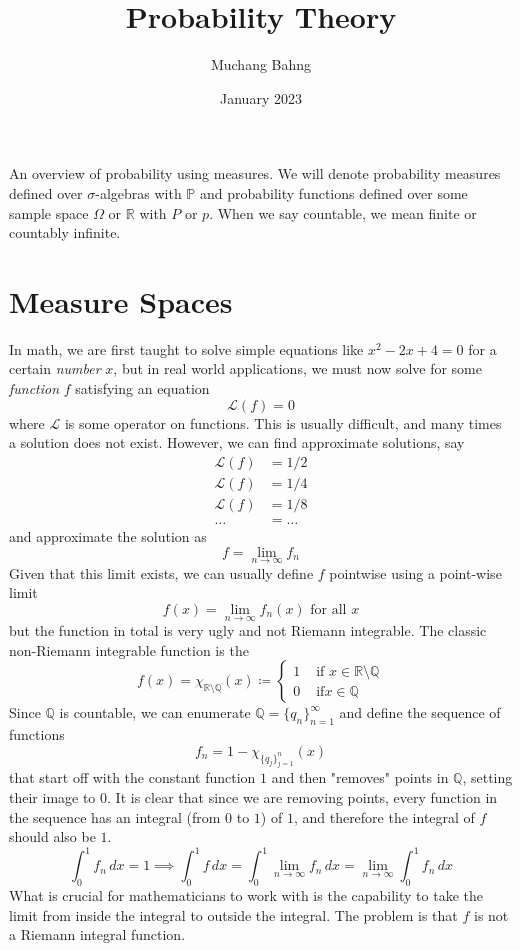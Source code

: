 \documentclass{article}
\theoremstyle{definition}
\theoremstyle{remark}
\theoremstyle{definition}
\begin{document}
\pagestyle{fancy}

\cfoot{\thepage / \pageref{LastPage}}

\title{Probability Theory}
\author{Muchang Bahng}
\date{January 2023}

\maketitle

An overview of probability using measures. We will denote probability measures defined over $\sigma$-algebras with $\mathbb{P}$ and probability functions defined over some sample space $\Omega$ or $\mathbb{R}$ with $P$ or $p$. When we say countable, we mean finite or countably infinite. 

\section{Measure Spaces}

In math, we are first taught to solve simple equations like $x^2 - 2x + 4 = 0$ for a certain \textit{number} $x$, but in real world applications, we must now solve for some \textit{function} $f$ satisfying an equation 
\[\mathcal{L}(f) = 0\]
where $\mathcal{L}$ is some operator on functions. This is usually difficult, and many times a solution does not exist. However, we can find approximate solutions, say 
\begin{align*}
    \mathcal{L}(f) & = 1/2 \\
    \mathcal{L}(f) & = 1/4 \\ 
    \mathcal{L}(f) & = 1/8 \\
    \ldots & = \ldots 
\end{align*}
and approximate the solution as 
\[f = \lim_{n \rightarrow \infty} f_n \]
Given that this limit exists, we can usually define $f$ pointwise using a point-wise limit 
\[f(x) = \lim_{n \rightarrow \infty} f_n (x) \text{ for all } x\]
but the function in total is very ugly and not Riemann integrable. The classic non-Riemann integrable function is the 
\[f(x) = \chi_{\mathbb{R} \setminus \mathbb{Q}} (x) \coloneqq \begin{cases} 
1 & \text{ if } x \in \mathbb{R} \setminus \mathbb{Q} \\
0 & \text{ if} x \in \mathbb{Q} 
\end{cases}\]
Since $\mathbb{Q}$ is countable, we can enumerate $\mathbb{Q} = \{q_n\}_{n=1}^\infty$ and define the sequence of functions 
\[f_n = 1 - \chi_{\{q_j\}_{j=1}^n}(x)\]
that start off with the constant function $1$ and then "removes" points in $\mathbb{Q}$, setting their image to $0$. It is clear that since we are removing points, every function in the sequence has an integral (from $0$ to $1$) of $1$, and therefore the integral of $f$ should also be $1$. 
\[\int_0^1 f_n \, dx = 1 \implies \int_0^1 f \,dx = \int_0^1 \lim_{n \rightarrow \infty} f_n \,dx = \lim_{n \rightarrow \infty} \int_0^1 f_n \,dx\]
What is crucial for mathematicians to work with is the capability to take the limit from inside the integral to outside the integral. The problem is that $f$ is not a Riemann integral function. 
\end{document}
